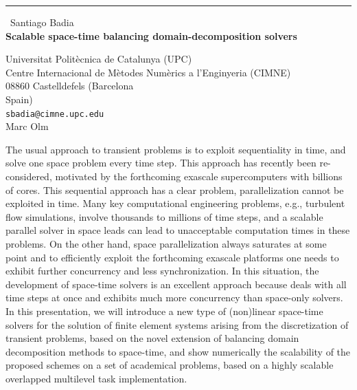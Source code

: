 \documentclass{report}
\begin{document}
\begin{center}
\rule{6in}{1pt} \
{\large Santiago Badia \\
{\bf Scalable space-time balancing domain-decomposition solvers}}

Universitat Polit\`ecnica de Catalunya (UPC) \\ Centre Internacional de M\`etodes Num\`erics a l'Enginyeria (CIMNE) \\ 08860 Castelldefels (Barcelona \\ Spain)
\\
{\tt sbadia@cimne.upc.edu}\\
Marc Olm\end{center}

The usual approach to transient problems is to exploit sequentiality in
time, and solve one space problem every time step. This approach has
recently been re-considered, motivated by the forthcoming exascale
supercomputers with billions of cores. This sequential approach has a
clear problem, parallelization cannot be exploited in time. Many key
computational engineering problems, e.g., turbulent flow simulations,
involve thousands to millions of time steps, and a scalable parallel
solver in space leads can lead to unacceptable computation times in these
problems. On the other hand, space parallelization always saturates at
some point and to efficiently exploit the forthcoming exascale platforms
one needs to exhibit further concurrency and less synchronization. In
this situation, the development of space-time solvers is an excellent
approach because deals with all time steps at once and exhibits much more
concurrency than space-only solvers. In this presentation, we will
introduce a new type of (non)linear space-time solvers for the solution
of finite element systems arising from the discretization of transient
problems, based on the novel extension of balancing domain decomposition
methods to space-time, and show numerically the scalability of the
proposed schemes on a set of academical problems, based on a highly
scalable overlapped multilevel task implementation.
\end{document}
